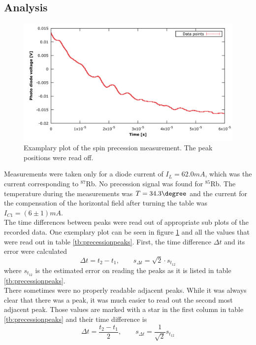 \subsection{Analysis}
\begin{figure}
	\centering
	\includegraphics[width=1.0\linewidth]{graphics/spinprecessionexample}
	\caption[Example spin precession]{Examplary plot of the spin precession measurement. The peak positions were read off.}
	\label{fig:spinprecessionexample}
\end{figure}
Measurements were taken only for a diode current of $I_L=\unit{62.0}{mA}$, which was the current corresponding to $^{87}$Rb. No precession signal was found for $^{85}$Rb. The temperature during the measurements was $T=\unit{34.3}{\degree}$ and the current for the compensation of the horizontal field after turning the table was $I_{C1}=\unit{(6\pm1)}{mA}$.\\
The time differences between peaks were read out of appropriate sub plots of the recorded data. One exemplary plot can be seen in figure \ref{fig:spinprecessionexample} and all the values that were read out in table \ref{tb:precessionpeaks}. First, the time difference $\Delta t$ and its error were calculated
\begin{equation}
\Delta t=t_2-t_1, \qquad s_{\Delta t}=\sqrt{2}\cdot s_{t_{12}}
\end{equation}
where $s_{t_{12}}$ is the estimated error on reading the peaks as it is listed in table \ref{tb:precessionpeaks}.\\
There sometimes were no properly readable adjacent peaks. While it was always clear that there was a peak, it was much easier to read out the second most adjacent peak. Those values are marked with a star in the first column in table \ref{tb:precessionpeaks} and their time difference is
\begin{equation}
\Delta t=\frac{t_2-t_1}{2},\qquad s_{\Delta t}=\frac{1}{\sqrt{2}}s_{t_{12}}
\end{equation}
